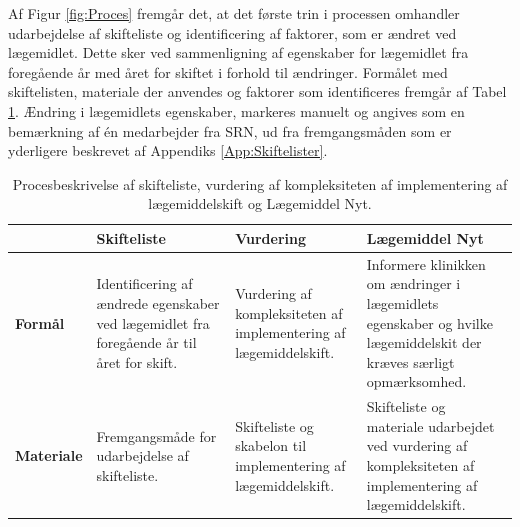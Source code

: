 Af Figur \ref{fig:Proces} fremgår det, at det første trin i processen omhandler udarbejdelse af skifteliste og identificering af faktorer, som er ændret ved lægemidlet. Dette sker ved sammenligning af egenskaber for lægemidlet fra foregående år med året for skiftet i forhold til ændringer. Formålet med skiftelisten, materiale der anvendes og faktorer som identificeres fremgår af Tabel \ref{table:Proces}. Ændring i lægemidlets egenskaber, markeres manuelt og angives som en bemærkning af én medarbejder fra SRN, ud fra fremgangsmåden som er yderligere beskrevet af Appendiks \ref{App:Skiftelister}.

\vspace{0.5cm}
\begin{table}[H]
\caption{Procesbeskrivelse af skifteliste, vurdering af kompleksiteten af implementering af lægemiddelskift og Lægemiddel Nyt.}
\label{table:Proces}
\centering
\begin{tabular}{p{1.8cm}|p{3.5cm}|p{3.5cm}|p{4.2cm}}
\cellcolor[HTML]{C0C0C0}\textbf{} & \cellcolor[HTML]{C0C0C0}\textbf{Skifteliste} & \cellcolor[HTML]{C0C0C0}\textbf{Vurdering} & \cellcolor[HTML]{C0C0C0}\textbf{Lægemiddel Nyt}\\ \hline
\cellcolor[HTML]{C0C0C0}\textbf{Formål} & Identificering af ændrede egenskaber ved lægemidlet fra foregående år til året for skift. & Vurdering af kompleksiteten af implementering af lægemiddelskift. & Informere klinikken om ændringer i lægemidlets egenskaber og hvilke lægemiddelskit der kræves særligt opmærksomhed. \\ \hline
\cellcolor[HTML]{C0C0C0}\textbf{Materiale} & Fremgangsmåde for udarbejdelse af skifteliste. & Skifteliste  og skabelon til implementering af lægemiddelskift. & Skifteliste og materiale udarbejdet ved vurdering af kompleksiteten af implementering af lægemiddelskift. \\ \hline

\end{tabular}
\end{table}
